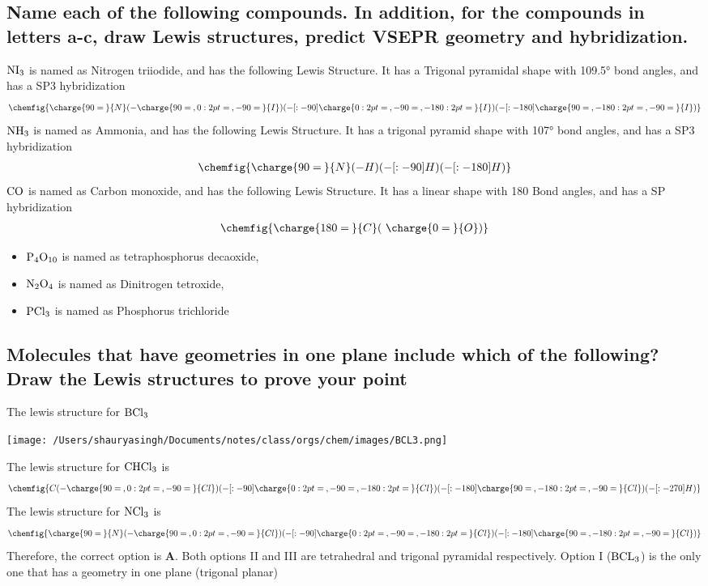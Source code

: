 \documentclass[11pt]{article}
\begin{document}
\subsection{Name each of the following compounds. In addition, for the compounds in letters a-c, draw Lewis structures, predict VSEPR geometry and hybridization.}
\label{sec:org58b7961}
\(\ce{NI3}\) is named as Nitrogen triiodide, and has the following Lewis Structure. It has a Trigonal pyramidal shape with 109.5° bond angles, and has a SP3 hybridization
\begin{align}
\chemfig{\charge{90=\:}{N}(-\charge{90=\:, 0:2pt=\:, -90=\:}{I})(-[:-90]\charge{0:2pt=\:, -90=\:, -180:2pt=\:}{I})(-[:-180]\charge{90=\:, -180:2pt=\:, -90=\:}{I})}
\end{align}
\(\ce{NH3}\) is named as Ammonia, and has the following Lewis Structure. It has a trigonal pyramid shape with 107° bond angles, and has a SP3 hybridization
\begin{align}
\chemfig{\charge{90=\:}{N}(-{H})(-[:-90]{H})(-[:-180]{H})}
\end{align}
\(\ce{CO}\) is named as Carbon monoxide, and has the following Lewis Structure. It has a linear shape with 180\textdegree{} Bond angles, and has a SP hybridization
\begin{align}
\chemfig{\charge{180=\:}{C}(~\charge{0=\:}{O})}
\end{align}
\begin{itemize}
\item \(\ce{P4O10}\) is named as tetraphosphorus decaoxide,
\item \(\ce{N2O4}\) is named as Dinitrogen tetroxide,
\item \(\ce{PCl3}\) is named as Phosphorus trichloride
\end{itemize}

\subsection{Molecules that have geometries in one plane include which of the following? Draw the Lewis structures to prove your point}
\label{sec:org5b1e616}
The lewis structure for \(\ce{BCl3}\)
\begin{center}
\texttt{[image: /Users/shauryasingh/Documents/notes/class/orgs/chem/images/BCL3.png]}
\end{center}
The lewis structure for \(\ce{CHCl3}\) is
\begin{align}
\chemfig{{C}(-\charge{90=\:, 0:2pt=\:, -90=\:}{Cl})(-[:-90]\charge{0:2pt=\:, -90=\:, -180:2pt=\:}{Cl})(-[:-180]\charge{90=\:, -180:2pt=\:, -90=\:}{Cl})(-[:-270]{H})}
\end{align}
The lewis structure for \(\ce{NCl3}\) is
\begin{align}
\chemfig{\charge{90=\:}{N}(-\charge{90=\:, 0:2pt=\:, -90=\:}{Cl})(-[:-90]\charge{0:2pt=\:, -90=\:, -180:2pt=\:}{Cl})(-[:-180]\charge{90=\:, -180:2pt=\:, -90=\:}{Cl})}
\end{align}
Therefore, the correct option is \textbf{A}. Both options II and III are tetrahedral and trigonal pyramidal respectively. Option I (\(\ce{BCL3}\)) is the only one that has a geometry in one plane (trigonal planar)
\end{document}
